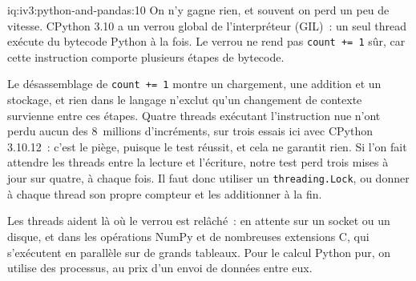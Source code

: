 \begin{solution}{iq:iv3:python-and-pandas:10}
On n'y gagne rien, et souvent on perd un peu de vitesse. CPython 3.10 a un verrou global de l'interpréteur (GIL)~: un seul thread exécute du bytecode Python à la fois. Le verrou ne rend pas \texttt{count += 1} sûr, car cette instruction comporte plusieurs étapes de bytecode.

Le désassemblage de \texttt{count += 1} montre un chargement, une addition et un stockage, et rien dans le langage n'exclut qu'un changement de contexte survienne entre ces étapes. Quatre threads exécutant l'instruction nue n'ont perdu aucun des 8~millions d'incréments, sur trois essais ici avec CPython 3.10.12~: c'est le piège, puisque le test réussit, et cela ne garantit rien. Si l'on fait attendre les threads entre la lecture et l'écriture, notre test perd trois mises à jour sur quatre, à chaque fois. Il faut donc utiliser un \texttt{threading.Lock}, ou donner à chaque thread son propre compteur et les additionner à la fin.

Les threads aident là où le verrou est relâché~: en attente sur un socket ou un disque, et dans les opérations NumPy et de nombreuses extensions C, qui s'exécutent en parallèle sur de grands tableaux. Pour le calcul Python pur, on utilise des processus, au prix d'un envoi de données entre eux.

\end{solution}

